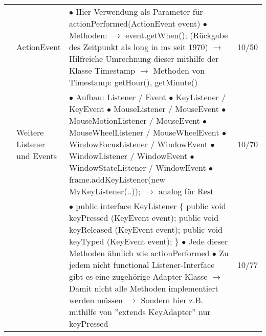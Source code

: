 \documentclass[11pt,a4paper]{article}
\begin{document}
\begin{center}
\begin{longtable}[h]{ | p{2.3cm} | p{2.3cm} | p{12.6cm} | p{1.2cm} | }
	& ActionEvent & \makecell[l]{$\bullet$ Hier Verwendung als Parameter für actionPerformed(ActionEvent event) \\
	$\bullet$ Methoden: \\
	\hspace{0.4cm} $\rightarrow$ event.getWhen(); (Rückgabe des Zeitpunkt als long in ms seit 1970) \\
	\hspace{0.4cm} $\rightarrow$ Hilfreiche Umrechnung dieser mithilfe der Klasse Timestamp \\
	\hspace{0.4cm} $\rightarrow$ Methoden von Timestamp: getHour(), getMinute() }  & 10/50 \\ \cline{2-4}
	
	& \makecell[l]{ Weitere \\ Listener \\ und Events}  & \makecell[l]{$\bullet$ Aufbau: Listener / Event\\
	$\bullet$ KeyListener / KeyEvent \\
	$\bullet$ MouseListener / MouseEvent \\
	$\bullet$ MouseMotionListener / MouseEvent \\
	$\bullet$ MouseWheelListener / MouseWheelEvent \\
	$\bullet$ WindowFocusListener / WindowEvent \\
	$\bullet$ WindowListener / WindowEvent \\
	$\bullet$ WindowStateListener / WindowEvent \\
	$\bullet$ frame.addKeyListener(new MyKeyListener(..));
	\hspace{0.4cm} $\rightarrow$ analog für Rest }  & 10/70 \\ \cline{2-4}
	
	& \makecell[l]{KeyListener} & \makecell[l]{
	$\bullet$ public interface KeyListener \{ \\
	\hspace{1cm} public void keyPressed (KeyEvent event); \\
	\hspace{1cm} public void keyReleased (KeyEvent event); \\
	\hspace{1cm} public void keyTyped (KeyEvent event); \} \\
	$\bullet$ Jede dieser Methoden ähnlich wie actionPerformed\\
	$\bullet$ Zu jedem nicht functional Listener-Interface gibt \\
	\hspace{0.4cm} es eine zugehörige Adapter-Klasse \\
	\hspace{0.4cm} $\rightarrow$ Damit nicht alle Methoden implementiert werden müssen \\
	\hspace{0.4cm} $\rightarrow$ Sondern hier z.B. mithilfe von ''extends KeyAdapter'' nur keyPressed} & 10/77 \\ \cline{2-4}
	

\end{longtable}
\end{center}
\end{document}
